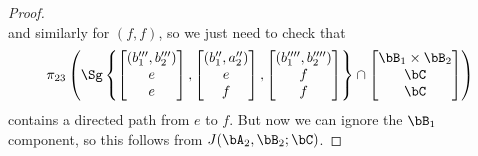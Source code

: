 \begin{proof}
\[\]
and similarly for $(f,f)$, so we just need to check that
\[
\pi_{23}\left(\Sg\left\{\begin{bmatrix}(b_1''',b_2''')\\ e\\ e\end{bmatrix},\begin{bmatrix}(b_1'',a_2'')\\ e\\ f\end{bmatrix}, \begin{bmatrix}(b_1'''',b_2'''')\\ f\\ f\end{bmatrix}\right\} \cap \begin{bmatrix}\bB_1\times \bB_2\\ \bC\\ \bC \end{bmatrix}\right)
\]
contains a directed path from $e$ to $f$. But now we can ignore the $\bB_1$ component, so this follows from $J(\bA_2,\bB_2;\bC)$.
\end{proof}

